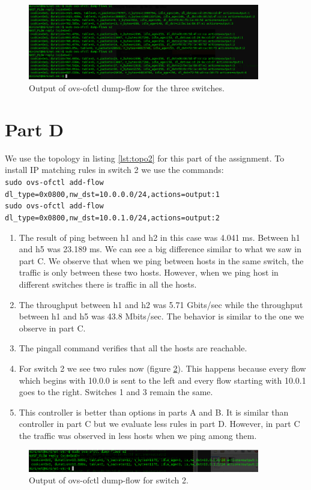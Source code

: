 \documentclass[a4paper,12pt]{article}
\begin{document}
\begin{figure}
  \centering
  \includegraphics[width=0.9\textwidth]{dumpsC.png}
  \caption{Output of ovs-ofctl dump-flow for the three switches.}\label{fig:dumpsC}
\end{figure}

\section*{Part D}

We use the topology in listing \ref{lst:topo2} for this part of the assignment.  To install IP matching rules in switch 2 we use the commands:\\

\texttt{sudo ovs-ofctl add-flow dl\_type=0x0800,nw\_dst=10.0.0.0/24,actions=output:1}\\
\texttt{sudo ovs-ofctl add-flow dl\_type=0x0800,nw\_dst=10.0.1.0/24,actions=output:2}\\



\begin{enumerate}
\item The result of ping between h1 and h2 in this case was 4.041 ms.  Between h1 and h5 was 23.189 ms.  We can see a big difference similar to what we saw in part C. We observe that when we ping between hosts in the same switch, the traffic is only between these two hosts.  However, when we ping host in different switches there is traffic in all the hosts.
\item The throughput between h1 and h2 was 5.71 Gbits/sec while the throughput between h1 and h5 was 43.8 Mbits/sec.  The behavior is similar to the one we observe in part C.
\item The pingall command verifies that all the hosts are reachable. 
\item For switch 2 we see two rules now (figure \ref{fig:dumpsD}). This happens because every flow which begins with 10.0.0 is sent to the left and every flow starting with 10.0.1 goes to the right. Switches 1 and 3 remain the same.  
\item This controller is better than options in parts A and B.  It is similar than controller in part C but we evaluate less rules in part D.  However, in part C the traffic was observed in less hosts when we ping among them.
\end{enumerate}

\begin{figure}
  \centering
  \includegraphics[width=0.9\textwidth]{dumpsD.png}
  \caption{Output of ovs-ofctl dump-flow for switch 2.}\label{fig:dumpsD}
\end{figure}
\end{document}
